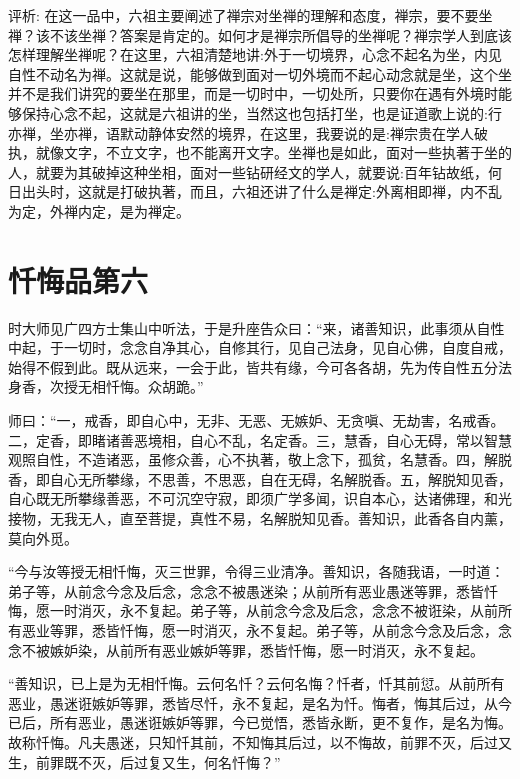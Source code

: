\documentclass[12pt,twoside,openany]{book}
\newcommand{\kai}[1]{{\CJKfamily{kai}#1}}
\begin{document}
\kai{评析: 在这一品中，六祖主要阐述了禅宗对坐禅的理解和态度，禅宗，要不要坐禅？该不该坐禅？答案是肯定的。如何才是禅宗所倡导的坐禅呢？禅宗学人到底该怎样理解坐禅呢？在这里，六祖清楚地讲:外于一切境界，心念不起名为坐，内见自性不动名为禅。这就是说，能够做到面对一切外境而不起心动念就是坐，这个坐并不是我们讲究的要坐在那里，而是一切时中，一切处所，只要你在遇有外境时能够保持心念不起，这就是六祖讲的坐，当然这也包括打坐，也是证道歌上说的:行亦禅，坐亦禅，语默动静体安然的境界，在这里，我要说的是:禅宗贵在学人破执，就像文字，不立文字，也不能离开文字。坐禅也是如此，面对一些执著于坐的人，就要为其破掉这种坐相，面对一些钻研经文的学人，就要说:百年钻故纸，何日出头时，这就是打破执著，而且，六祖还讲了什么是禅定:外离相即禅，内不乱为定，外禅内定，是为禅定。}

\chapter{忏悔品第六}
时大师见广四方士集山中听法，于是升座告众曰：“来，诸善知识，此事须从自性中起，于一切时，念念自净其心，自修其行，见自己法身，见自心佛，自度自戒，始得不假到此。既从远来，一会于此，皆共有缘，今可各各胡，先为传自性五分法身香，次授无相忏悔。众胡跪。”

师曰：“一，戒香，即自心中，无非、无恶、无嫉妒、无贪嗔、无劫害，名戒香。二，定香，即睹诸善恶境相，自心不乱，名定香。三，慧香，自心无碍，常以智慧观照自性，不造诸恶，虽修众善，心不执著，敬上念下，孤贫，名慧香。四，解脱香，即自心无所攀缘，不思善，不思恶，自在无碍，名解脱香。五，解脱知见香，自心既无所攀缘善恶，不可沉空守寂，即须广学多闻，识自本心，达诸佛理，和光接物，无我无人，直至菩提，真性不易，名解脱知见香。善知识，此香各自内薰，莫向外觅。

“今与汝等授无相忏悔，灭三世罪，令得三业清净。善知识，各随我语，一时道：弟子等，从前念今念及后念，念念不被愚迷染；从前所有恶业愚迷等罪，悉皆忏悔，愿一时消灭，永不复起。弟子等，从前念今念及后念，念念不被诳染，从前所有恶业等罪，悉皆忏悔，愿一时消灭，永不复起。弟子等，从前念今念及后念，念念不被嫉妒染，从前所有恶业嫉妒等罪，悉皆忏悔，愿一时消灭，永不复起。

“善知识，已上是为无相忏悔。云何名忏？云何名悔？{\color{red}忏者，忏其前愆。}从前所有恶业，愚迷诳嫉妒等罪，悉皆尽忏，永不复起，是名为忏。{\color{red}悔者，悔其后过}，从今已后，所有恶业，愚迷诳嫉妒等罪，今已觉悟，悉皆永断，更不复作，是名为悔。故称忏悔。凡夫愚迷，只知忏其前，不知悔其后过，以不悔故，前罪不灭，后过又生，前罪既不灭，后过复又生，何名忏悔？”
\end{document}
